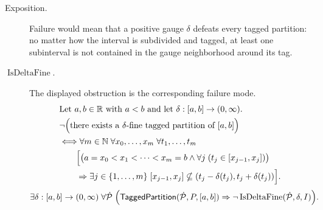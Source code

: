 \begin{remark*}
\begin{description}
  \item[Exposition.]
Failure would mean that a positive gauge $\delta$ defeats every tagged
partition: no matter how the interval is subdivided and tagged, at least
one subinterval is not contained in the gauge neighborhood around its tag.


  \item[\(\operatorname{IsDeltaFine}.\)]
  The displayed obstruction is the corresponding failure mode.
  \[
\begin{aligned}
&\text{Let } a,b \in \mathbb{R} \text{ with } a < b \text{ and let } \delta:[a,b]\to(0,\infty).\\
&\neg\Bigl(\text{there exists a }\delta\text{-fine tagged partition of }[a,b]\Bigr)\\
&\Longleftrightarrow
\forall m \in \mathbb{N}\;\forall x_0,\ldots,x_m\;\forall t_1,\ldots,t_m\\
&\qquad\Bigl[
\bigl(a=x_0<x_1<\cdots<x_m=b
\land \forall j\;(t_j\in[x_{j-1},x_j])\bigr)\\
&\qquad\Rightarrow
\exists j\in\{1,\ldots,m\}\;
[x_{j-1},x_j]\nsubseteq(t_j-\delta(t_j),t_j+\delta(t_j))
\Bigr].
\end{aligned}
  \]
  \[
\exists \delta:[a,b]\to(0,\infty)\;
\forall \dot{\mathcal{P}}\;\Bigl(
\mathsf{TaggedPartition}(\dot{\mathcal{P}},P,[a,b])
\Rightarrow
\neg\operatorname{IsDeltaFine}(\dot{\mathcal{P}},\delta,I)
\Bigr).
  \]
\end{description}
\end{remark*}

